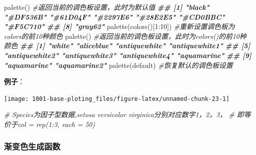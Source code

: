 \documentclass[
]{book}
\newenvironment{Shaded}{\begin{snugshade}}{\end{snugshade}}
\newcommand{\AttributeTok}[1]{\textcolor[rgb]{0.77,0.63,0.00}{#1}}
\newcommand{\CommentTok}[1]{\textcolor[rgb]{0.56,0.35,0.01}{\textit{#1}}}
\newcommand{\DecValTok}[1]{\textcolor[rgb]{0.00,0.00,0.81}{#1}}
\newcommand{\DocumentationTok}[1]{\textcolor[rgb]{0.56,0.35,0.01}{\textbf{\textit{#1}}}}
\newcommand{\FunctionTok}[1]{\textcolor[rgb]{0.00,0.00,0.00}{#1}}
\newcommand{\NormalTok}[1]{#1}
\newcommand{\SpecialCharTok}[1]{\textcolor[rgb]{0.00,0.00,0.00}{#1}}
\newcommand{\StringTok}[1]{\textcolor[rgb]{0.31,0.60,0.02}{#1}}
\begin{document}
\begin{Shaded}
\begin{Highlighting}[]
\FunctionTok{palette}\NormalTok{() }\CommentTok{\#返回当前的调色板设置，此时为默认值}
\DocumentationTok{\#\# [1] "black"   "\#DF536B" "\#61D04F" "\#2297E6" "\#28E2E5" "\#CD0BBC" "\#F5C710"}
\DocumentationTok{\#\# [8] "gray62"}
\FunctionTok{palette}\NormalTok{(}\FunctionTok{colors}\NormalTok{()[}\DecValTok{1}\SpecialCharTok{:}\DecValTok{10}\NormalTok{]) }\CommentTok{\#重新设置调色板为colors的前10种颜色}
\FunctionTok{palette}\NormalTok{()               }\CommentTok{\#返回当前的调色板设置，此时为colors()的前10种颜色}
\DocumentationTok{\#\#  [1] "white"         "aliceblue"     "antiquewhite"  "antiquewhite1"}
\DocumentationTok{\#\#  [5] "antiquewhite2" "antiquewhite3" "antiquewhite4" "aquamarine"   }
\DocumentationTok{\#\#  [9] "aquamarine"    "aquamarine2"}
\FunctionTok{palette}\NormalTok{(}\StringTok{\textquotesingle{}default\textquotesingle{}}\NormalTok{) }\CommentTok{\#恢复默认的调色板设置}
\end{Highlighting}
\end{Shaded}

\textbf{例子}：

\begin{Shaded}
\end{Shaded}

\begin{center}\texttt{[image: 1001-base-ploting\_files/figure-latex/unnamed-chunk-23-1]} \end{center}

\begin{Shaded}
\begin{Highlighting}[]
\CommentTok{\# Species为因子型数据,setosa versicolor virginica分别对应数字1，2，3，}
\CommentTok{\# 即等价于col = rep(1:3, each = 50)}
\end{Highlighting}
\end{Shaded}

\hypertarget{ux6e10ux53d8ux8272ux751fux6210ux51fdux6570}{%
\subsubsection{渐变色生成函数}\label{ux6e10ux53d8ux8272ux751fux6210ux51fdux6570}}
\end{document}
